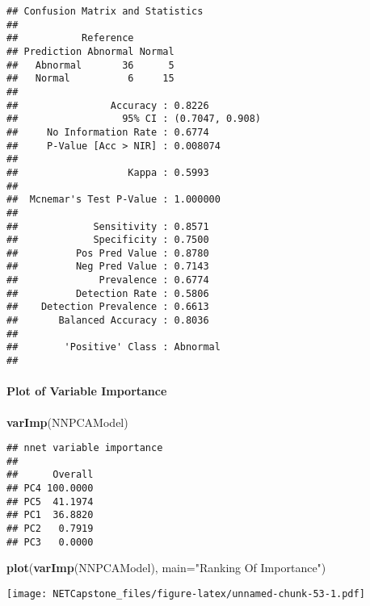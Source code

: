 \documentclass[
]{article}
\newenvironment{Shaded}{\begin{snugshade}}{\end{snugshade}}
\newcommand{\DataTypeTok}[1]{\textcolor[rgb]{0.13,0.29,0.53}{#1}}
\newcommand{\KeywordTok}[1]{\textcolor[rgb]{0.13,0.29,0.53}{\textbf{#1}}}
\newcommand{\NormalTok}[1]{#1}
\newcommand{\StringTok}[1]{\textcolor[rgb]{0.31,0.60,0.02}{#1}}
\begin{document}
\begin{verbatim}
## Confusion Matrix and Statistics
## 
##           Reference
## Prediction Abnormal Normal
##   Abnormal       36      5
##   Normal          6     15
##                                          
##                Accuracy : 0.8226         
##                  95% CI : (0.7047, 0.908)
##     No Information Rate : 0.6774         
##     P-Value [Acc > NIR] : 0.008074       
##                                          
##                   Kappa : 0.5993         
##                                          
##  Mcnemar's Test P-Value : 1.000000       
##                                          
##             Sensitivity : 0.8571         
##             Specificity : 0.7500         
##          Pos Pred Value : 0.8780         
##          Neg Pred Value : 0.7143         
##              Prevalence : 0.6774         
##          Detection Rate : 0.5806         
##    Detection Prevalence : 0.6613         
##       Balanced Accuracy : 0.8036         
##                                          
##        'Positive' Class : Abnormal       
## 
\end{verbatim}

\hypertarget{plot-of-variable-importance-4}{%
\paragraph{Plot of Variable
Importance}\label{plot-of-variable-importance-4}}

\begin{Shaded}
\begin{Highlighting}[]
\KeywordTok{varImp}\NormalTok{(NNPCAModel)}
\end{Highlighting}
\end{Shaded}

\begin{verbatim}
## nnet variable importance
## 
##      Overall
## PC4 100.0000
## PC5  41.1974
## PC1  36.8820
## PC2   0.7919
## PC3   0.0000
\end{verbatim}

\begin{Shaded}
\begin{Highlighting}[]
\KeywordTok{plot}\NormalTok{(}\KeywordTok{varImp}\NormalTok{(NNPCAModel), }\DataTypeTok{main=}\StringTok{"Ranking Of Importance"}\NormalTok{)}
\end{Highlighting}
\end{Shaded}

\texttt{[image: NETCapstone\_files/figure-latex/unnamed-chunk-53-1.pdf]}
\end{document}

